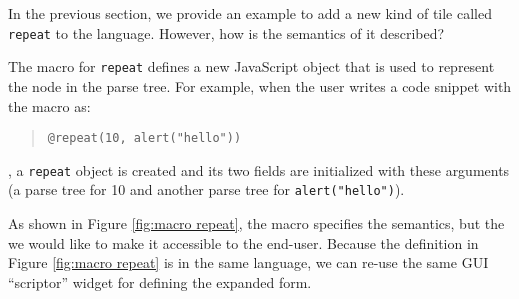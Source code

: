 \label{sec:execution}

  In the previous section, we provide an example to add a new kind of
tile called {\tt repeat} to the language.  However, how is the
semantics of it described?

  The macro for {\tt repeat} defines a new JavaScript object that is
used to represent the node in the parse tree.  For example, when the user
writes a code snippet with the macro as:
\begin{quote}
{\tt @repeat(10, alert("hello"))}
\end{quote}
, a {\tt repeat} object is created and its two fields are initialized
with these arguments (a parse tree for 10 and another parse tree for
{\tt alert("hello")}).

  As shown in Figure \ref{fig:macro repeat}, the macro specifies the
semantics, but the we would like to make it accessible to the
end-user.  Because the definition in Figure \ref{fig:macro repeat} is
in the same language, we can re-use the same GUI ``scriptor'' widget
for defining the expanded form.







